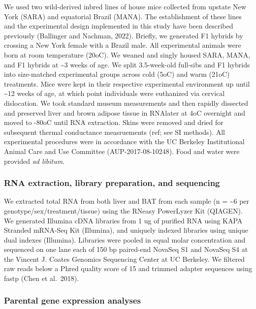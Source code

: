 \documentclass[9pt,twocolumn,twoside,lineno]{pnas-new}
\begin{document}
We used two wild-derived inbred lines of house mice collected from
upstate New York (SARA) and equatorial Brazil (MANA). The establishment
of these lines and the experimental design implemented in this study
have been described previously (Ballinger and Nachman, 2022). Briefly,
we generated F1 hybrids by crossing a New York female with a Brazil
male. All experimental animals were born at room temperature (20oC). We
weaned and singly housed SARA, MANA, and F1 hybrids at \textasciitilde3
weeks of age. We split 3.5-week-old full-sibs and F1 hybrids into
size-matched experimental groups across cold (5oC) and warm (21oC)
treatments. Mice were kept in their respective experimental environment
up until \textasciitilde12 weeks of age, at which point individuals were
euthanized via cervical dislocation. We took standard museum
measurements and then rapidly dissected and preserved liver and brown
adipose tissue in RNAlater at 4oC overnight and moved to -80oC until RNA
extraction. Skins were removed and dried for subsequent thermal
conductance measruements (ref; see SI methods). All experimental
procedures were in accordance with the UC Berkeley Institutional Animal
Care and Use Committee (AUP-2017-08-10248). Food and water were provided
\emph{ad libitum}.

\hypertarget{rna-extraction-library-preparation-and-sequencing}{%
\subsubsection*{RNA extraction, library preparation, and
sequencing}\label{rna-extraction-library-preparation-and-sequencing}}

We extracted total RNA from both liver and BAT from each sample (n =
\textasciitilde6 per genotype/sex/treatment/tissue) using the RNeasy
PowerLyzer Kit (QIAGEN). We generated Illumina cDNA libraries from 1 ug
of purified RNA using KAPA Stranded mRNA-Seq Kit (Illumina), and
uniquely indexed libraries using unique dual indexes (Illumina).
Libraries were pooled in equal molar concentration and sequenced on one
lane each of 150 bp paired-end NovaSeq S1 and NovaSeq S4 at the Vincent
J. Coates Genomics Sequencing Center at UC Berkeley. We filtered raw
reads below a Phred quality score of 15 and trimmed adapter sequences
using fastp (Chen et al.~2018).

\hypertarget{parental-gene-expression-analyses}{%
\subsubsection*{Parental gene expression
analyses}\label{parental-gene-expression-analyses}}
\end{document}
